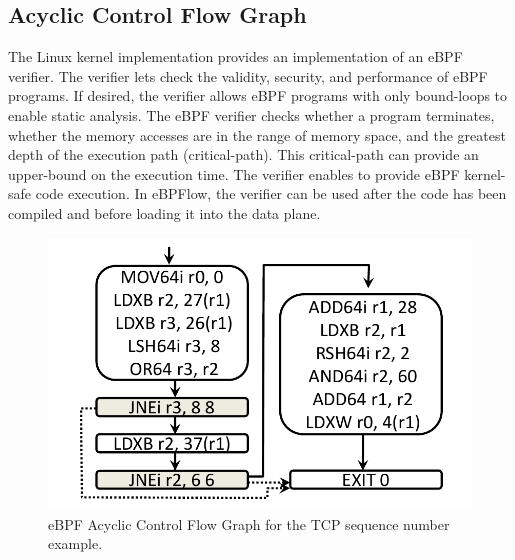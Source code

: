 


\subsection{Acyclic Control Flow Graph}
The Linux kernel implementation provides an implementation of an eBPF verifier.
The verifier lets check the validity, security, and performance of eBPF programs.
If desired, the verifier allows eBPF programs with only bound-loops to enable static analysis.
The eBPF verifier checks whether a program terminates, whether the memory accesses are in the range of memory space, and the greatest depth of the execution path (critical-path).
This critical-path can provide an upper-bound on the execution time.
The verifier enables to provide eBPF kernel-safe code execution.
In eBPFlow, the verifier can be used after the code has been compiled and before loading it into the data plane.

\begin{figure}[htb]
\centering
\includegraphics[width=.8\linewidth]{figures/eBPFACFG.pdf}
\caption{eBPF Acyclic Control Flow Graph for the TCP sequence number example.}
\label{fig:acfg}
\end{figure}

